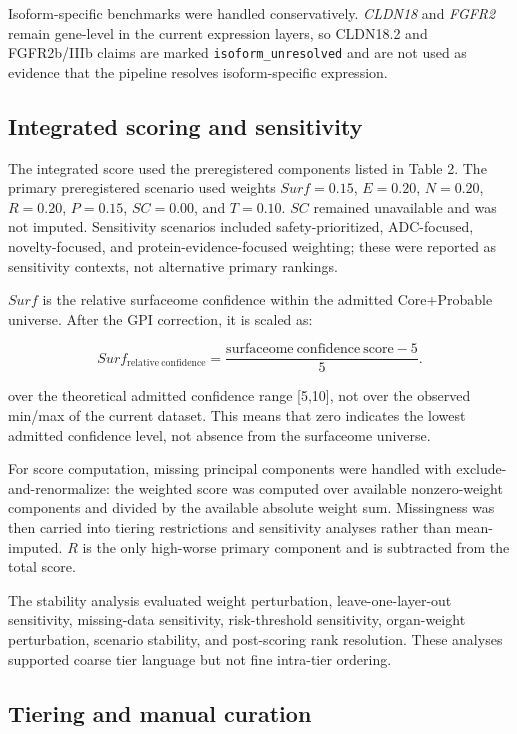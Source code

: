 \documentclass[twocolumn]{article}
\begin{document}
Isoform-specific benchmarks were handled conservatively. \textit{CLDN18} and \textit{FGFR2} remain gene-level in the current expression layers, so CLDN18.2 and FGFR2b/\allowbreak{}IIIb claims are marked \texttt{isoform\_unresolved} and are not used as evidence that the pipeline resolves isoform-specific expression.

\subsection{Integrated scoring and sensitivity}

The integrated score used the preregistered components listed in Table 2. The primary preregistered scenario used weights $Surf=0.15$, $E=0.20$, $N=0.20$, $R=0.20$, $P=0.15$, $SC=0.00$, and $T=0.10$. $SC$ remained unavailable and was not imputed. Sensitivity scenarios included safety-prioritized, ADC-focused, novelty-focused, and protein-evidence-focused weighting; these were reported as sensitivity contexts, not alternative primary rankings.

$Surf$ is the relative surfaceome confidence within the admitted Core+\allowbreak{}Probable universe. After the GPI correction, it is scaled as:

\begin{equation}
Surf_{\mathrm{relative\ confidence}} =
\frac{\mathrm{surfaceome\ confidence\ score} - 5}{5}.
\end{equation}

over the theoretical admitted confidence range [5,10], not over the observed min/\allowbreak{}max of the current dataset. This means that zero indicates the lowest admitted confidence level, not absence from the surfaceome universe.

For score computation, missing principal components were handled with exclude-and-renormalize: the weighted score was computed over available nonzero-weight components and divided by the available absolute weight sum. Missingness was then carried into tiering restrictions and sensitivity analyses rather than mean-imputed. $R$ is the only high-worse primary component and is subtracted from the total score.

The stability analysis evaluated weight perturbation, leave-one-layer-out sensitivity, missing-data sensitivity, risk-threshold sensitivity, organ-weight perturbation, scenario stability, and post-scoring rank resolution. These analyses supported coarse tier language but not fine intra-tier ordering.

\subsection{Tiering and manual curation}
\end{document}
